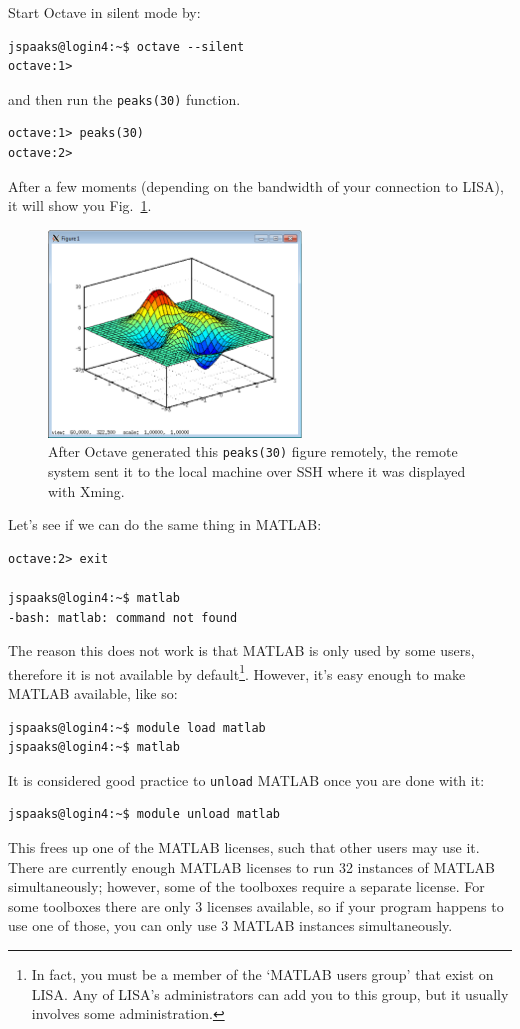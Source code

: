 Start Octave in silent mode by:
\begin{lstlisting}[style=basic,style=bash]
jspaaks@login4:~$ octave --silent
octave:1>
\end{lstlisting}
and then run the \lstinline[style=bashinline]{peaks(30)} function.
\begin{lstlisting}[style=basic,style=bash]
octave:1> peaks(30)
octave:2>
\end{lstlisting}
After a few moments (depending on the bandwidth of your connection to LISA), it will show you Fig.~\ref{fig:octave-peaks-x-forwarding}.
\begin{figure}[!htb]
  \centering
    \includegraphics[width=0.6\textwidth]{./../eps/octave-peaks-x-forwarding.eps}
  \caption{After Octave generated this \lstinline[style=bashinline]{peaks(30)} figure remotely, the remote system sent it to the local machine over SSH where it was displayed with Xming.}
  \label{fig:octave-peaks-x-forwarding}
\end{figure}


\needspace{4em}
Let's see if we can do the same thing in MATLAB:
\begin{lstlisting}[style=basic,style=bash]
octave:2> exit

jspaaks@login4:~$ matlab
-bash: matlab: command not found
\end{lstlisting}
The reason this does not work is that MATLAB is only used by some users, therefore it is not available by default\footnote{In fact, you must be a member of the `MATLAB users group' that exist on LISA. Any of LISA's administrators can add you to this group, but it usually involves some administration.}. However, it's easy enough to make MATLAB available, like so:
\begin{lstlisting}[style=basic,style=bash]
jspaaks@login4:~$ module load matlab
jspaaks@login4:~$ matlab
\end{lstlisting}
It is considered good practice to \lstinline[style=bashinline]{unload} MATLAB once you are done with it:
\begin{lstlisting}[style=basic,style=bash]
jspaaks@login4:~$ module unload matlab
\end{lstlisting}
This frees up one of the MATLAB licenses, such that other users may use it. There are currently enough MATLAB licenses to run 32 instances of MATLAB simultaneously; however, some of the toolboxes require a separate license. For some toolboxes there are only 3 licenses available, so if your program happens to use one of those, you can only use 3 MATLAB instances simultaneously.

